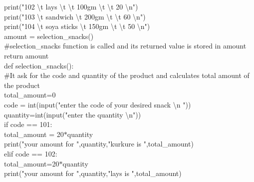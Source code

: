 \documentclass[10pt,a4paper]{article}
\begin{document}
\begin{flushleft}
\hspace*{0.5cm}    print("102 \textbackslash t lays \textbackslash t \textbackslash t 100gm \textbackslash t \textbackslash t 20 \textbackslash n")\\
\hspace*{0.5cm}    print("103 \textbackslash t sandwich \textbackslash t 200gm \textbackslash t \textbackslash t 60 \textbackslash n")\\
\hspace*{0.5cm}    print("104 \textbackslash t soya sticks \textbackslash t 150gm \textbackslash t \textbackslash t 50 \textbackslash n")\\
\hspace*{0.5cm}    amount = selection\_snacks()\\  \#selection\_snacks function is called and its returned value is stored in amount\\
\hspace*{0.5cm}    return amount\\
\bigskip
def selection\_snacks():\\  \#It ask for the code and quantity of the product and calculates total amount of the product \\
\hspace*{0.5cm}    total\_amount=0\\
\hspace*{0.5cm}    code = int(input("enter the code of your desired snack \textbackslash n "))\\
\hspace*{0.5cm}    quantity=int(input("enter the quantity \textbackslash n"))\\
\hspace*{0.5cm}    if code == 101:\\
\hspace*{0.5cm}\hspace*{0.5cm}        total\_amount = 20$\ast$quantity\\
\hspace*{0.5cm}\hspace*{0.5cm}        print("your amount for ",quantity,"kurkure is ",total\_amount)\\
\hspace*{0.5cm}    elif code == 102:\\
\hspace*{0.5cm}\hspace*{0.5cm}        total\_amount=20$\ast$quantity\\
\hspace*{0.5cm}\hspace*{0.5cm}        print("your amount for ",quantity,"lays is ",total\_amount)\\

\end{flushleft}
\end{document}
